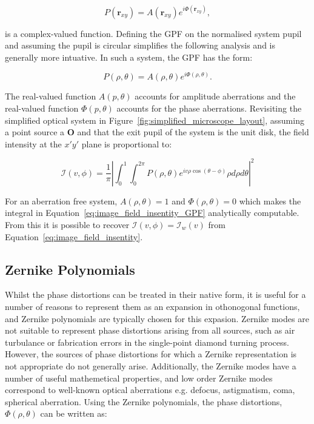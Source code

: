 \begin{equation}\label{eq:GPF}
	P\left(\textbf{r}_{xy}\right) = A\left(\textbf{r}_{xy}\right)e^{i\Phi\left(\textbf{r}_{xy}\right)},
\end{equation}

is a complex-valued function. Defining the GPF on the normalised system 
pupil and assuming the pupil is circular simplifies the following analysis
and is generally more intuative. In such a system, the GPF has the form:

\begin{equation}\label{eq:GPF_polar}
P\left(\rho,\theta\right) = A\left(\rho,\theta\right)e^{i\Phi\left(\rho,\theta\right)}.
\end{equation}

The real-valued function $A\left(p,\theta\right)$ accounts for amplitude
aberrations and the real-valued function $\Phi\left(p,\theta\right)$ 
accounts for the phase aberrations. Revisiting the simplified optical
system in Figure~\ref{fig:simplified_microscope_layout}, assuming a point
source a $\textbf{O}$ and that the exit pupil of the system is the unit 
disk, the field intensity at the $x'y'$ plane is proportional 
to\cite{goodman2005introduction,born2013principles}:

\begin{equation}\label{eq:image_field_insentity_GPF}
	\mathcal{I}(v,\phi) = \frac{1}{\pi}\left|\int^{1}_{0}\int^{2\pi}_{0}P\left(\rho,\theta\right)e^{iv\rho\cos(\theta-\phi)}\rho d\rho d\theta\right|^{2}
\end{equation}

For an aberration free system, $A\left(\rho,\theta\right) = 1$ and 
$\Phi\left(\rho,\theta\right) = 0$ which makes the integral in 
Equation~\ref{eq:image_field_insentity_GPF} analytically computable. From 
this it is possible to recover $\mathcal{I}(v,\phi) = \mathcal{I}_{w}(v)$
from Equation~\ref{eq:image_field_insentity}.

\subsection{Zernike Polynomials}
\label{subsec:zernike}

Whilst the phase distortions can be treated in their native form, it is 
useful for a number of reasons to represent them as an expansion in
othonogonal functions, and Zernike polynomials are typically chosen for 
this expasion\cite{zernike1934diffraction,noll1976zernike,mahajan1994zernike}.
Zernike modes are not suitable to represent phase distortions arising 
from all sources, such as air turbulance or fabrication errors in the 
single-point diamond turning process\cite{wyant1992basic}. However, the 
sources of phase distortions for which a Zernike representation is not
appropriate do not generally arise. Additionally, the Zernike modes have 
a number of useful mathemetical properties, and low order Zernike modes 
correspond to well-known optical aberrations e.g. defocus, astigmatism, 
coma, spherical 
aberration\cite{born2013principles,booth2007adaptive,zernike1934diffraction}.
Using the Zernike polynomials, the phase distortions, $\Phi\left(\rho,\theta\right)$
can be written as:


